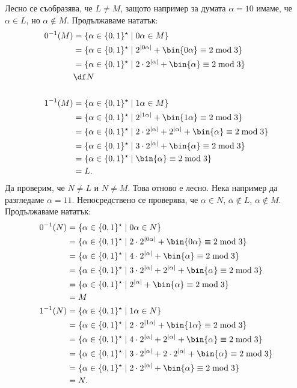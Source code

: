 \begin{example}
Лесно се съобразява, че $L \neq M$, защото например за думата $\alpha = 10$
имаме, че $\alpha \in L$, но $\alpha \not\in M$.
Продължаваме нататък:
\begin{align*}
  0^{-1}(M) & = \{\alpha \in \{0,1\}^\star \mid 0\alpha \in M\}\\
              & = \{\alpha \in \{0,1\}^\star \mid 2^{|0\alpha|} + \bin{0\alpha} \equiv 2 \bmod 3\}\\
              & = \{\alpha \in \{0,1\}^\star \mid 2\cdot 2^{|\alpha|} + \bin{\alpha} \equiv 2 \bmod 3\}\\
              & \df N\\
  \\
  1^{-1}(M) & = \{\alpha \in \{0,1\}^\star \mid 1\alpha \in M\}\\
            & = \{\alpha \in \{0,1\}^\star \mid 2^{|1\alpha|} + \bin{1\alpha} \equiv 2 \bmod 3\}\\
            & = \{\alpha \in \{0,1\}^\star \mid 2\cdot 2^{|\alpha|} + 2^{|\alpha|} + \bin{\alpha} \equiv 2 \bmod 3\}\\
            & = \{\alpha \in \{0,1\}^\star \mid 3\cdot 2^{|\alpha|} + \bin{\alpha} \equiv 2 \bmod 3\}\\
            & = \{\alpha \in \{0,1\}^\star \mid \bin{\alpha} \equiv 2 \bmod 3\}\\
            & = L.
\end{align*}
Да проверим, че $N \neq L$ и $N \neq M$.
Това отново е лесно. Нека например да разгледаме $\alpha = 11$.
Непосредствено се проверява, че $\alpha \in N$, $\alpha \not\in L$, $\alpha \not\in M$.
Продължаваме нататък:
\begin{align*}
  0^{-1}(N) & = \{\alpha \in \{0,1\}^\star \mid 0\alpha \in N\}\\
              & = \{\alpha \in \{0,1\}^\star \mid 2\cdot 2^{|0\alpha|} + \bin{0\alpha} \equiv 2 \bmod 3\}\\
              & = \{\alpha \in \{0,1\}^\star \mid 4\cdot 2^{|\alpha|} + \bin{\alpha} \equiv 2 \bmod 3\}\\
              & = \{\alpha \in \{0,1\}^\star \mid 3\cdot 2^{|\alpha|} + 2^{|\alpha|} + \bin{\alpha} \equiv 2 \bmod 3\}\\
              & = \{\alpha \in \{0,1\}^\star \mid 2^{|\alpha|} + \bin{\alpha} \equiv 2 \bmod 3\}\\
              & = M
  \\
  1^{-1}(N) & = \{\alpha \in \{0,1\}^\star \mid 1\alpha \in N\}\\
              & = \{\alpha \in \{0,1\}^\star \mid 2\cdot 2^{|1\alpha|} + \bin{1\alpha} \equiv 2 \bmod 3\}\\
              & = \{\alpha \in \{0,1\}^\star \mid 4\cdot 2^{|\alpha|} + 2^{|\alpha|} + \bin{\alpha} \equiv 2 \bmod 3\}\\
              & = \{\alpha \in \{0,1\}^\star \mid 3\cdot 2^{|\alpha|} + 2\cdot 2^{|\alpha|} + \bin{\alpha} \equiv 2 \bmod 3\}\\
              & = \{\alpha \in \{0,1\}^\star \mid 2\cdot 2^{|\alpha|} + \bin{\alpha} \equiv 2 \bmod 3\}\\
              & = N.
\end{align*}


\end{example}
